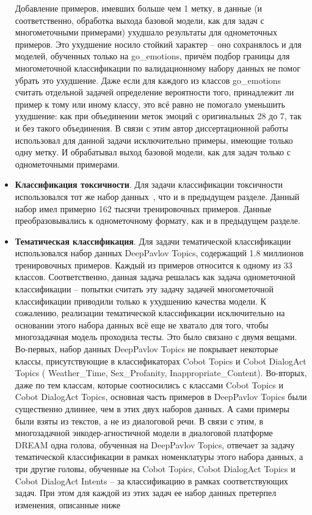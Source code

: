 \begin{itemize}
Добавление примеров, имевших больше чем 1 метку, в данные (и соответственно, обработка выхода базовой модели, как для задач с многометочными примерами) ухудшало результаты для однометочных примеров. Это ухудшение носило стойкий характер -- оно сохранялось и для моделей, обученных только на go\_emotions, причём подбор границы для многометочной классификации по валидационному набору данных не помог убрать это ухудшение. Даже если для каждого из классов go\_emotions считать отдельной задачей определение вероятности того, принадлежит ли пример к тому или иному классу, это всё равно не помогало уменьшить ухудшение: как при объединении меток эмоций с оригинальных 28 до 7, так и без такого объединения.
В связи с этим автор диссертационной работы использовал для данной задачи исключительно примеры, имеющие только одну метку. И обрабатывал выход базовой модели, как для задач только с однометочными примерами.
 \item\textbf{Классификация токсичности}. Для задачи классификации токсичности использовался тот же набор данных~\cite{toxic_kaggle}, что и в предыдущем разделе. Данный набор имел примерно 162 тысячи тренировочных примеров. Данные преобразовывались к однометочному формату, как и в предыдущем разделе.
\item\textbf{Тематическая классификация}. Для задачи тематической классификации использовался набор данных {DeepPavlov Topics}\cite{dp_topics}, содержащий 1.8 миллионов тренировочных примеров. Каждый из примеров относится к одному из 33 классов. Соответственно, данная задача решалась как задача однометочной классификации -- попытки считать эту задачу задачей многометочной классификации приводили только к ухудшению качества модели.
К сожалению, реализации тематической классификации исключительно на основании этого набора данных всё еще не хватало для того, чтобы многозадачная модель проходила тесты. Это было связано с двумя вещами. Во-первых, набор данных {DeepPavlov Topics} не покрывает некоторые классы, присутствующие в классификаторах {Cobot Topics} и {Cobot DialogAct Topics} ( Weather\_Time, Sex\_Profanity, Inappropriate\_Content). Во-вторых, даже по тем классам, которые соотносились с классами {Cobot Topics} и {Cobot DialogAct Topics}, основная часть примеров в {DeepPavlov Topics} были существенно длиннее, чем в этих двух наборов данных. А сами примеры были взяты из текстов, а не из диалоговой речи. В связи с этим, в многозадачной энкодер-агностичной модели в диалоговой платформе {DREAM} одна голова, обученная на {DeepPavlov Topics}, отвечает за задачу тематической классификации в рамках номенклатуры этого набора данных, а три другие головы, обученные на {Cobot Topics}, {Cobot DialogAct Topics} и {Cobot DialogAct Intents} -- за классификацию в рамках соответствующих задач. При этом для каждой из этих задач ее набор данных претерпел изменения, описанные ниже

\end{itemize}
